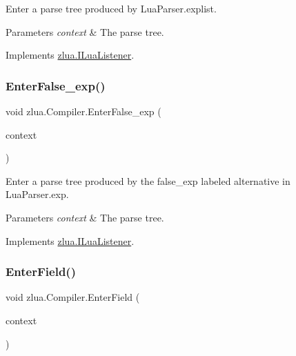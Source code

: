 Enter a parse tree produced by Lua\+Parser.\+explist. 


\begin{DoxyParams}{Parameters}
{\em context} & The parse tree.\\
\hline
\end{DoxyParams}


Implements \mbox{\hyperlink{interfacezlua_1_1_i_lua_listener_a9e310e407a85f410ec1e17d632778708}{zlua.\+I\+Lua\+Listener}}.

\mbox{\label{classzlua_1_1_compiler_a2679b9bd28b5726f5b1d45c391d44b1a}} 
\subsubsection{\texorpdfstring{Enter\+False\+\_\+exp()}{EnterFalse\_exp()}}
{\footnotesize\ttfamily void zlua.\+Compiler.\+Enter\+False\+\_\+exp (\begin{DoxyParamCaption}\item[{\mbox{[}\+Not\+Null\mbox{]} \mbox{\hyperlink{classzlua_1_1_lua_parser_1_1_false__exp_context}{Lua\+Parser.\+False\+\_\+exp\+Context}}}]{context }\end{DoxyParamCaption})}



Enter a parse tree produced by the {\ttfamily false\+\_\+exp} labeled alternative in Lua\+Parser.\+exp. 


\begin{DoxyParams}{Parameters}
{\em context} & The parse tree.\\
\hline
\end{DoxyParams}


Implements \mbox{\hyperlink{interfacezlua_1_1_i_lua_listener_acaeea04a84e6859bedcaa48c486cb640}{zlua.\+I\+Lua\+Listener}}.

\mbox{\label{classzlua_1_1_compiler_a52a01acfde2fcb93cbec5f59549288da}} 
\subsubsection{\texorpdfstring{Enter\+Field()}{EnterField()}}
{\footnotesize\ttfamily void zlua.\+Compiler.\+Enter\+Field (\begin{DoxyParamCaption}\item[{\mbox{[}\+Not\+Null\mbox{]} \mbox{\hyperlink{classzlua_1_1_lua_parser_1_1_field_context}{Lua\+Parser.\+Field\+Context}}}]{context }\end{DoxyParamCaption})}



